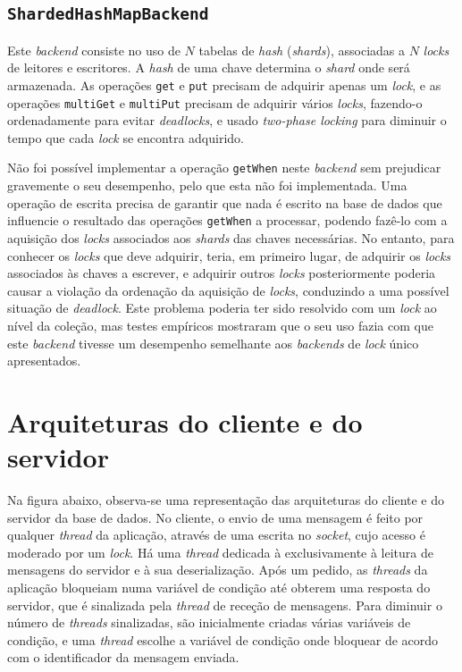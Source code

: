 \documentclass[11pt, a4paper]{article}
\begin{document}
\subsection{\texttt{ShardedHashMapBackend}}

Este \emph{backend} consiste no uso de $N$ tabelas de \emph{hash} (\emph{shards}), associadas a $N$
\emph{locks} de leitores e escritores. A \emph{hash} de uma chave determina o \emph{shard} onde será
armazenada. As operações \texttt{get} e \texttt{put} precisam de adquirir apenas um \emph{lock}, e
as operações \texttt{multiGet} e \texttt{multiPut} precisam de adquirir vários \emph{locks},
fazendo-o ordenadamente para evitar \emph{deadlocks}, e usado \emph{two-phase locking} para diminuir
o tempo que cada \emph{lock} se encontra adquirido.

Não foi possível implementar a operação \texttt{getWhen} neste \emph{backend} sem prejudicar
gravemente o seu desempenho, pelo que esta não foi implementada. Uma operação de escrita precisa de
garantir que nada é escrito na base de dados que influencie o resultado das operações
\texttt{getWhen} a processar, podendo fazê-lo com a aquisição dos \emph{locks} associados aos
\emph{shards} das chaves necessárias. No entanto, para conhecer os \emph{locks} que deve adquirir,
teria, em primeiro lugar, de adquirir os \emph{locks} associados às chaves a escrever, e adquirir
outros \emph{locks} posteriormente poderia causar a violação da ordenação da aquisição de
\emph{locks}, conduzindo a uma possível situação de \emph{deadlock}. Este problema poderia ter sido
resolvido com um \emph{lock} ao nível da coleção, mas testes empíricos mostraram que o seu uso fazia
com que este \emph{backend} tivesse um desempenho semelhante aos \emph{backends} de \emph{lock}
único apresentados.

\section{Arquiteturas do cliente e do servidor}

Na figura abaixo, observa-se uma representação das arquiteturas do cliente e do servidor da base de
dados. No cliente, o envio de uma mensagem é feito por qualquer \emph{thread} da aplicação, através
de uma escrita no \emph{socket}, cujo acesso é moderado por um \emph{lock}. Há uma \emph{thread}
dedicada à exclusivamente à leitura de mensagens do servidor e à sua deserialização. Após um pedido,
as \emph{threads} da aplicação bloqueiam numa variável de condição até obterem uma resposta do
servidor, que é sinalizada pela \emph{thread} de receção de mensagens. Para diminuir o número de
\emph{threads} sinalizadas, são inicialmente criadas várias variáveis de condição, e uma
\emph{thread} escolhe a variável de condição onde bloquear de acordo com o identificador da mensagem
enviada.
\end{document}
